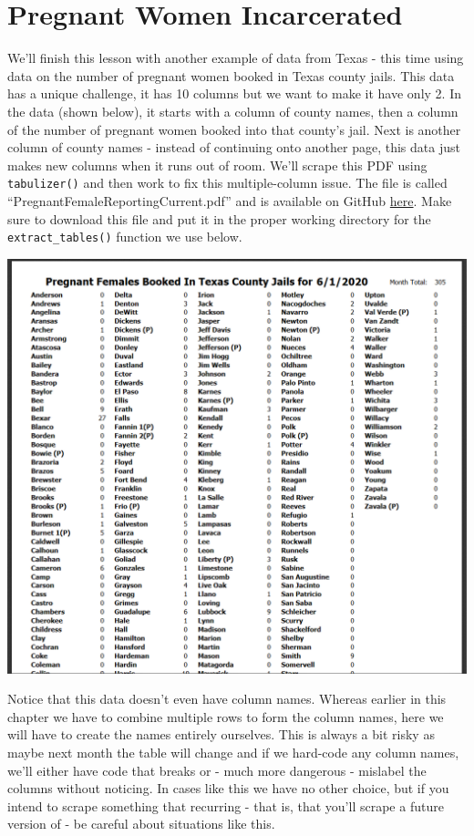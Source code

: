 \documentclass[
  12pt,
]{book}
\begin{document}
\hypertarget{pregnant-women-incarcerated}{%
\section{Pregnant Women Incarcerated}\label{pregnant-women-incarcerated}}

We'll finish this lesson with another example of data from Texas - this time using data on the number of pregnant women booked in Texas county jails. This data has a unique challenge, it has 10 columns but we want to make it have only 2. In the data (shown below), it starts with a column of county names, then a column of the number of pregnant women booked into that county's jail. Next is another column of county names - instead of continuing onto another page, this data just makes new columns when it runs out of room. We'll scrape this PDF using \texttt{tabulizer()} and then work to fix this multiple-column issue. The file is called ``PregnantFemaleReportingCurrent.pdf'' and is available on GitHub \href{https://github.com/jacobkap/crimebythenumbers/blob/master/data/PregnantFemaleReportingCurrent.pdf}{here}. Make sure to download this file and put it in the proper working directory for the \texttt{extract\_tables()} function we use below.

\includegraphics{images/pregnant.PNG}

Notice that this data doesn't even have column names. Whereas earlier in this chapter we have to combine multiple rows to form the column names, here we will have to create the names entirely ourselves. This is always a bit risky as maybe next month the table will change and if we hard-code any column names, we'll either have code that breaks or - much more dangerous - mislabel the columns without noticing. In cases like this we have no other choice, but if you intend to scrape something that recurring - that is, that you'll scrape a future version of - be careful about situations like this.
\end{document}
